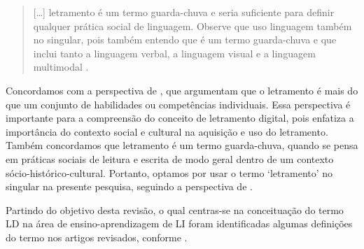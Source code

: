\begin{quote}
{[}\ldots{]} letramento é um termo guarda-chuva e seria suficiente para
definir qualquer prática social de linguagem. Observe que uso linguagem
também no singular, pois também entendo que é um termo guarda-chuva e
que inclui tanto a linguagem verbal, a linguagem visual e a linguagem
multimodal \cite[p. 1165]{paiva2021letramento}.
\end{quote}

Concordamos com a perspectiva de \textcite[p. 18]{dudeney2016letramentos},
que argumentam que o letramento é mais do que um conjunto de habilidades
ou competências individuais. Essa perspectiva é importante para a
compreensão do conceito de letramento digital, pois enfatiza a
importância do contexto social e cultural na aquisição e uso do
letramento. Também concordamos que letramento é um termo guarda-chuva,
quando se pensa em práticas sociais de leitura e escrita de modo geral
dentro de um contexto sócio-histórico-cultural. Portanto, optamos por
usar o termo `letramento' no singular
na presente pesquisa, seguindo a perspectiva de \textcite{paiva2021letramento}.

Partindo do objetivo desta revisão, o qual centras-se na conceituação do termo
LD na área de ensino-aprendizagem de LI foram identificadas algumas
definições do termo nos artigos revisados, conforme .


